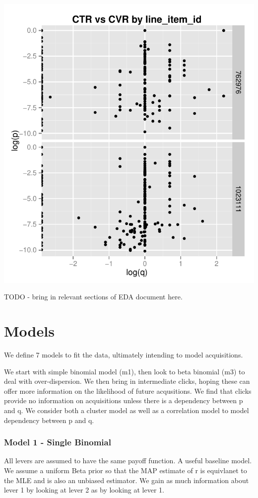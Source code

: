 \documentclass[11pt,a4,singlespacing,titlepagenumber=on]{scrreprt}
\numberwithin{equation}{chapter} %
\theoremstyle{remark}
\begin{document}
\includegraphics{CTRvsCVR}

TODO - bring in relevant sections of EDA document here.

\chapter{Models}
We define 7 models to fit the data, ultimately intending to model acquisitions.

We start with simple binomial model (m1), then look to beta binomial (m3) to deal with over-dispersion. We then bring in intermediate clicks, hoping these can offer more information on the likelihood of future acqusitions. We find that clicks provide no information on acquisitions unless there is a dependency between p and q. We consider both a cluster model as well as a correlation model to model dependency between p and q.

\subsection{Model 1 - Single Binomial} 
All levers are assumed to have the same payoff function. A useful baseline model. We assume a uniform Beta prior so that the MAP estimate of r is equivlanet to the MLE and is also an unbiased estimator. We gain as much information about lever 1 by looking at lever 2 as by looking at lever 1.
\end{document}
